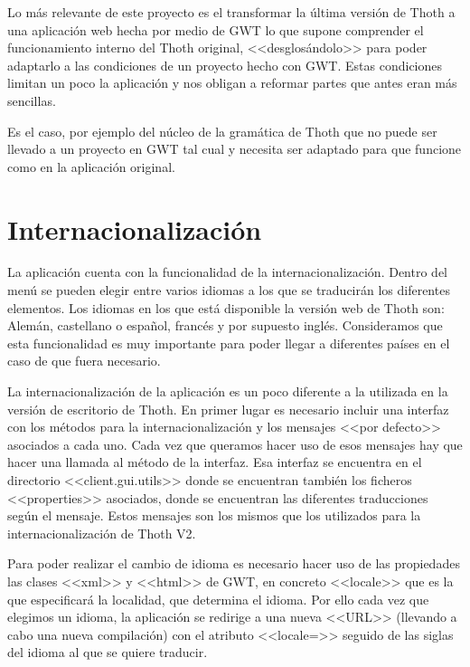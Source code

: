 
Lo más relevante de este proyecto es el transformar la última versión de Thoth a una aplicación web hecha por medio de GWT lo que supone comprender el funcionamiento interno del Thoth original, <<desglosándolo>> para poder adaptarlo a las condiciones de un proyecto hecho con GWT.
Estas condiciones limitan un poco la aplicación y nos obligan a reformar partes que antes eran más sencillas.

Es el caso, por ejemplo del núcleo de la gramática de Thoth que no puede ser llevado a un proyecto en GWT tal cual y necesita ser adaptado para que funcione como en la aplicación original.




\section{Internacionalización}
La aplicación cuenta con la funcionalidad de la internacionalización. Dentro del menú se pueden elegir entre varios idiomas a los que se traducirán los diferentes elementos. Los idiomas en los que está disponible la versión web de Thoth son: Alemán, castellano o español, francés y por supuesto inglés. Consideramos que esta funcionalidad es muy importante para poder llegar a diferentes países en el caso de que fuera necesario.

La internacionalización de la aplicación es un poco diferente a la utilizada en la versión de escritorio de Thoth. En primer lugar es necesario incluir una interfaz con los métodos para la internacionalización y los mensajes <<por defecto>> asociados a cada uno. Cada vez que queramos hacer uso de esos mensajes hay que hacer una llamada al método de la interfaz. Esa interfaz se encuentra en el directorio <<client.gui.utils>> donde se encuentran también los ficheros <<properties>> asociados, donde se encuentran las diferentes traducciones según el mensaje. Estos mensajes son los mismos que los utilizados para la internacionalización de Thoth V2.

Para poder realizar el cambio de idioma es necesario hacer uso de las propiedades las clases <<xml>> y <<html>> de GWT, en concreto <<locale>> que es la que especificará la localidad, que determina el idioma. Por ello cada vez que elegimos un idioma, la aplicación se redirige a una nueva <<URL>> (llevando a cabo una nueva compilación) con el atributo <<locale=>> seguido de las siglas del idioma al que se quiere traducir.


